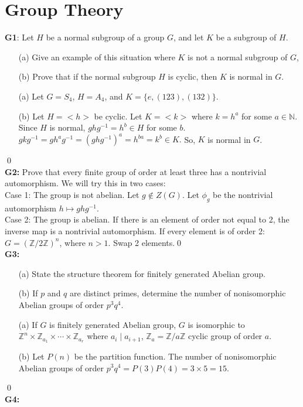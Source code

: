 \chapter{Group Theory}
\textbf{G1}: Let $ H $ be a normal subgroup of a group $ G $, and let $ K $ be a subgroup of $ H $.
\begin{itemize}
	\item[(a)] Give an example of this situation where $ K $ is not a normal subgroup of $ G $,
	\item[(b)] Prove that if the normal subgroup $ H $ is cyclic, then $ K $ is normal in $ G $. 
\end{itemize}
\soln
\begin{itemize}
	\item[(a)] Let $ G=S_4 $, $ H=A_4 $, and $ K= \{e,(123),(132)\} $.
	\item[(b)] Let $ H = <h>$ be cyclic. Let $ K= <k> $ where $ k=h^a $ for some $ a\in \mathbb{N} $.\\
	Since $ H $ is normal, $ ghg^{-1}=h^b \in H$ for some $ b $.\\
	$ gkg^{-1}= gh^a g^{-1}= (ghg^{-1})^a= h^{ba}=k^b\in K.$ So, $ K $ is normal in $ G $.
\end{itemize}
\qed\\
\textbf{G2:} Prove that every finite group of order at least three has a nontrivial automorphism. 
\soln We will try this in two cases:\\
Case 1: The group is not abelian. Let $ g\notin Z(G) $. Let $\phi_g $ be the nontrivial automorphism $ h\mapsto ghg^{-1} $.\\
Case 2: The group is abelian. If there is an element of order not equal to 2, the inverse map is a nontrivial automorphism. If every element is of order 2: $ G= (\mathbb{Z}/2\mathbb{Z})^n $, where $ n>1 $. Swap 2 elements.\qed\\
\textbf{G3:}
\begin{itemize}
	\item[(a)] State the structure theorem for finitely generated Abelian group.
	\item[(b)] If $ p $ and $ q $ are distinct primes, determine the number of nonisomorphic Abelian groups of order $ p^3q^4 $.
\end{itemize}
\soln
\begin{itemize}
	\item[(a)] If $ G $ is finitely generated Abelian group, $ G $ is isomorphic to $ \mathbb{Z}^n \times \mathbb{Z}_{a_1}\times \cdots \times \mathbb{Z}_{a_r}$ where $ a_i\mid a_{i+1} $, $ \mathbb{Z}_a = \mathbb{Z}/a\mathbb{Z}$ cyclic group of order $ a $. 
	\item[(b)] Let $ P(n) $ be the partition function. The number of nonisomorphic Abelian groups of order $ p^3q^4 = P(3)P(4)=3\times 5 = 15$.
\end{itemize}
\qed\\
\textbf{G4:}